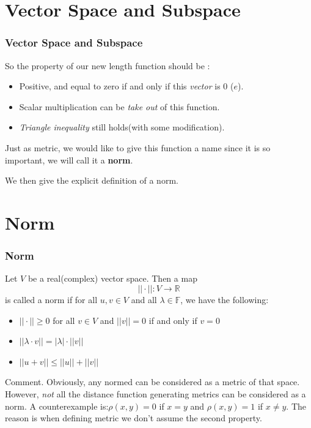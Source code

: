 \documentclass[12pt, t]{beamer}
\renewcommand{\emph}[1]{{\color{Turquoise3}\textsl{#1}}}
\begin{document}
\section{Vector Space and Subspace}
\begin{frame}
    \frametitle{Vector Space and Subspace}
    So the property of our new length function should be :
    \begin{itemize}
        \item Positive, and equal to zero if and only if this \emph{vector} is 0 ($e$).
        \item Scalar multiplication can be \emph{take out} of this function.
        \item \emph{Triangle inequality} still holds(with some modification).
    \end{itemize}
    \vspace{1em}
    Just as metric, we would like to give this function a name since it is so important, we will call it a \textbf{norm}.

    \vspace{1em}
    We then give the explicit definition of a norm.
\end{frame}

\section{Norm}
\begin{frame}
    \frametitle{Norm}
    \hspace{1em}
    Let $V$ be a real(complex) vector space. Then a map
    \begin{equation*}
        ||\cdot||:V\rightarrow \mathbb{R}
    \end{equation*}
    is called a norm if for all $u,v\in V$ and all $\lambda\in\mathbb{F}$, we have the following:
    \begin{itemize}
        \item $||\cdot||\geq 0$ for all $v\in V$ and $||v||=0$ if and only if $v=0$
        \item $||\lambda\cdot v||=|\lambda|\cdot ||v||$
        \item $||u+v||\leq ||u||+||v||$
    \end{itemize}
    \vspace{1em}
    Comment.  Obviously, any normed can be considered as a metric of that space. However, \emph{not} all the distance function generating metrics can be
    considered as a norm. A counterexample is:$\rho(x,y)=0$ if $x=y$ and $\rho(x,y)=1$ if $x\neq y$. The reason is when defining metric we don't assume
    the second property.

\end{frame}
\end{document}
